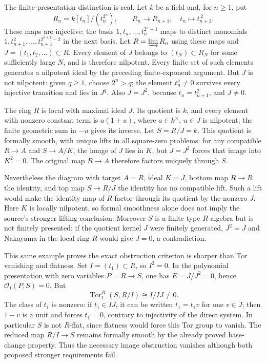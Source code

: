 The finite-presentation distinction is real. Let \(k\) be a field and, for \(n\ge1\), put \[
R_n=k[t_n]/(t_n^{2^n}),\qquad
R_n\longrightarrow R_{n+1},\quad t_n\longmapsto t_{n+1}^{\,2}.
\] These maps are injective: the basis \(1,t_n,\ldots,t_n^{2^n-1}\) maps to distinct monomials \(1,t_{n+1}^{2},\ldots,t_{n+1}^{2^{n+1}-2}\) in the next basis. Let \(R=\varinjlim R_n\) using these maps and \(J=(t_1,t_2,\ldots)\subset R\). Every element of \(J\) belongs to \((t_N)\subset R_N\) for some sufficiently large \(N\), and is therefore nilpotent. Every finite set of such elements generates a nilpotent ideal by the preceding finite-exponent argument. But \(J\) is not nilpotent: given \(q\ge1\), choose \(2^n>q\); the element \(t_n^q\ne0\) survives every injective transition and lies in \(J^q\). Also \(J=J^2\), because \(t_n=t_{n+1}^2\), and \(J\ne0\).

The ring \(R\) is local with maximal ideal \(J\). Its quotient is \(k\), and every element with nonzero constant term is \(a(1+u)\), where \(a\in k^\times\), \(u\in J\) is nilpotent; the finite geometric sum in \(-u\) gives its inverse. Let \(S=R/J=k\). This quotient is formally smooth, with unique lifts in all square-zero problems: for any compatible \(R\to A\) and \(S\to A/K\), the image of \(J\) lies in \(K\), but \(J=J^2\) forces that image into \(K^2=0\). The original map \(R\to A\) therefore factors uniquely through \(S\).

Nevertheless the diagram with target \(A=R\), ideal \(K=J\), bottom map \(R\to R\) the identity, and top map \(S\to R/J\) the identity has no compatible lift. Such a lift would make the identity map of \(R\) factor through its quotient by the nonzero \(J\). Here \(K\) is locally nilpotent, so formal smoothness alone does not imply the source's stronger lifting conclusion. Moreover \(S\) is a finite type \(R\)-algebra but is not finitely presented: if the quotient kernel \(J\) were finitely generated, \(J^2=J\) and Nakayama in the local ring \(R\) would give \(J=0\), a contradiction.

This same example proves the exact obstruction criterion is sharper than Tor vanishing and flatness. Set \(I=(t_1)\subset R\), so \(I^2=0\). In the polynomial presentation with zero variables \(P=R\to S\), one has \(E=J/J^2=0\), hence \(\mathcal O_I(P,S)=0\). But \[
\operatorname{Tor}_1^R(S,R/I)\cong I/IJ\ne0.
\] The class of \(t_1\) is nonzero: if \(t_1\in IJ\), it can be written \(t_1=t_1v\) for one \(v\in J\); then \(1-v\) is a unit and forces \(t_1=0\), contrary to injectivity of the direct system. In particular \(S\) is not \(R\)-flat, since flatness would force this Tor group to vanish. The reduced map \(R/I\to S\) remains formally smooth by the already proved base-change property. Thus the necessary image obstruction vanishes although both proposed stronger requirements fail.

